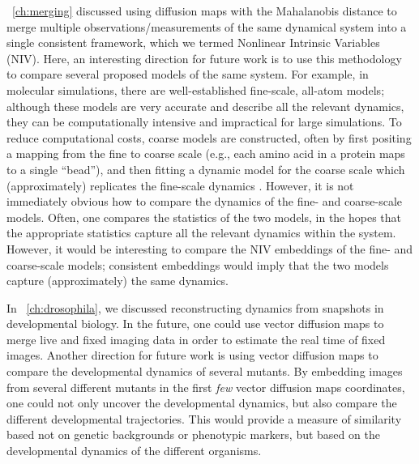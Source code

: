 \chap~\ref{ch:merging} discussed using diffusion maps with the Mahalanobis distance to merge multiple observations/measurements of the same dynamical system into a single consistent framework, which we termed Nonlinear Intrinsic Variables (NIV).
%
Here, an interesting direction for future work is to use this methodology to compare several proposed models of the same system.
%
For example, in molecular simulations, there are well-established fine-scale, all-atom models; although these models are very accurate and describe all the relevant dynamics, they can be computationally intensive and impractical for large simulations.
%
To reduce computational costs, coarse models are constructed, often by first positing a mapping from the fine to coarse scale (e.g., each amino acid in a protein maps to a single ``bead''), and then fitting a dynamic model for the coarse scale which (approximately) replicates the fine-scale dynamics \cite{saunders2013coarse, izvekov2005systematic, chaimovich2011coarse}.
%
However, it is not immediately obvious how to compare the dynamics of the fine- and coarse-scale models.
%
Often, one compares the statistics of the two models, in the hopes that the appropriate statistics capture all the relevant dynamics within the system.
%
However, it would be interesting to compare the NIV embeddings of the fine- and coarse-scale models; consistent embeddings would imply that the two models capture (approximately) the same dynamics.

In \chap~\ref{ch:drosophila}, we discussed reconstructing dynamics from snapshots in developmental biology.
%
%
In the future, one could use vector diffusion maps to merge live and fixed imaging data in order to estimate the real time of fixed images.
%
Another direction for future work is using vector diffusion maps to compare the developmental dynamics of several mutants.
%
By embedding images from several different mutants in the first {\em few} vector diffusion maps coordinates, one could not only uncover the developmental dynamics, but also compare the different developmental trajectories.
%
This would provide a measure of similarity based not on genetic backgrounds or phenotypic markers, but based on the developmental dynamics of the different organisms.


